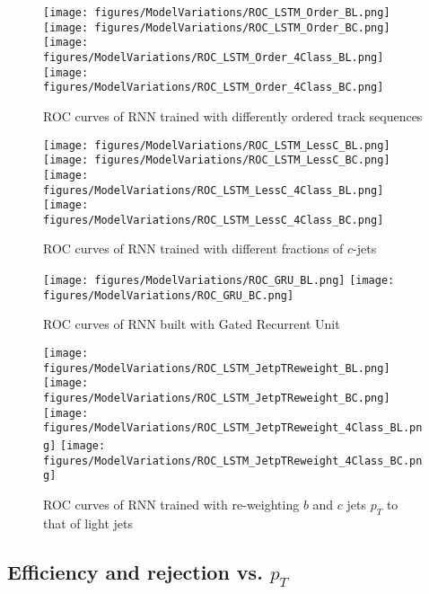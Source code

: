 \begin{figure}[htbp]
  \centering
 \texttt{[image: figures/ModelVariations/ROC\_LSTM\_Order\_BL.png]}
 \texttt{[image: figures/ModelVariations/ROC\_LSTM\_Order\_BC.png]}
 \texttt{[image: figures/ModelVariations/ROC\_LSTM\_Order\_4Class\_BL.png]}
 \texttt{[image: figures/ModelVariations/ROC\_LSTM\_Order\_4Class\_BC.png]}

\caption{ROC curves of RNN trained with differently ordered track sequences}
  \label{fig:Ordering}
\end{figure}

\begin{figure}[htbp]
  \centering
 \texttt{[image: figures/ModelVariations/ROC\_LSTM\_LessC\_BL.png]}
 \texttt{[image: figures/ModelVariations/ROC\_LSTM\_LessC\_BC.png]}
 \texttt{[image: figures/ModelVariations/ROC\_LSTM\_LessC\_4Class\_BL.png]}
 \texttt{[image: figures/ModelVariations/ROC\_LSTM\_LessC\_4Class\_BC.png]}

\caption{ROC curves of RNN trained with different fractions of $c$-jets}
  \label{fig:CFrac}
\end{figure}


\begin{figure}[htbp]
  \centering
 \texttt{[image: figures/ModelVariations/ROC\_GRU\_BL.png]}
 \texttt{[image: figures/ModelVariations/ROC\_GRU\_BC.png]}

\caption{ROC curves of RNN built with Gated Recurrent Unit}
  \label{fig:GRU}
\end{figure}


\begin{figure}[htbp]
  \centering
 \texttt{[image: figures/ModelVariations/ROC\_LSTM\_JetpTReweight\_BL.png]}
 \texttt{[image: figures/ModelVariations/ROC\_LSTM\_JetpTReweight\_BC.png]}
 \texttt{[image: figures/ModelVariations/ROC\_LSTM\_JetpTReweight\_4Class\_BL.png]}
 \texttt{[image: figures/ModelVariations/ROC\_LSTM\_JetpTReweight\_4Class\_BC.png]}

\caption{ROC curves of RNN trained with re-weighting $b$ and $c$ jets $p_{T}$ to that of light jets}
  \label{fig:pTReweight}
\end{figure}


\clearpage
\subsection{Efficiency and rejection vs. $p_T$}

